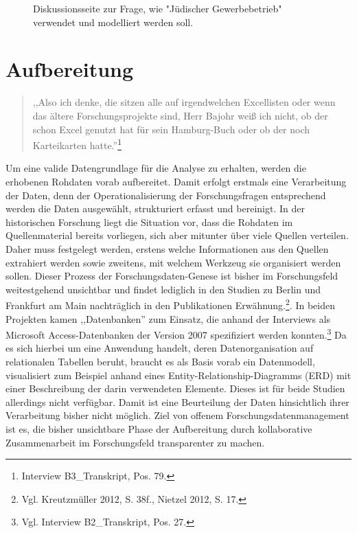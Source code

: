 \begin{figure}[h]
    \centering
    \caption[Diskussionsseite zu Jüdischer Gewerbebetrieb in Wikidata]{Diskussionsseite zur Frage, wie "Jüdischer Gewerbebetrieb" verwendet und modelliert werden soll.}
    \label{fig:x cubed graph}
\end{figure}

\section{Aufbereitung}

\begin{quote}
    ,,Also ich denke, die sitzen alle auf irgendwelchen Excellisten oder wenn das ältere Forschungsprojekte sind, Herr Bajohr weiß ich nicht, ob der schon Excel genutzt hat für sein Hamburg-Buch oder ob der noch Karteikarten hatte.''\footnote{Interview B3\_Transkript, Pos. 79.}
\end{quote}

Um eine valide Datengrundlage für die Analyse zu erhalten, werden die erhobenen Rohdaten vorab aufbereitet. Damit erfolgt erstmals eine Verarbeitung der Daten, denn der Operationalisierung der Forschungsfragen entsprechend werden die Daten ausgewählt, strukturiert erfasst und bereinigt. In der historischen Forschung liegt die Situation vor, dass die Rohdaten im Quellenmaterial bereits vorliegen, sich aber mitunter über viele Quellen verteilen. Daher muss festgelegt werden, erstens welche Informationen aus den Quellen extrahiert werden sowie zweitens, mit welchem Werkzeug sie organisiert werden sollen. Dieser Prozess der Forschungsdaten-Genese ist bisher im Forschungsfeld weitestgehend unsichtbar und findet lediglich in den Studien zu Berlin und Frankfurt am Main nachträglich in den Publikationen Erwähnung.\footnote{Vgl. Kreutzmüller 2012, S. 38f., Nietzel 2012, S. 17.}. In beiden Projekten kamen ,,Datenbanken'' zum Einsatz, die anhand der Interviews als Microsoft Access-Datenbanken der Version 2007 spezifiziert werden konnten.\footnote{Vgl. Interview B2\_Transkript, Pos. 27.} Da es sich hierbei um eine Anwendung handelt, deren Datenorganisation auf relationalen Tabellen beruht, braucht es als Basis vorab ein Datenmodell, visualisiert zum Beispiel anhand eines Entity-Relationship-Diagramms (ERD) mit einer Beschreibung der darin verwendeten Elemente. Dieses ist für beide Studien allerdings nicht verfügbar. Damit ist eine Beurteilung der Daten hinsichtlich ihrer Verarbeitung bisher nicht möglich. Ziel von offenem Forschungsdatenmanagement ist es, die bisher unsichtbare Phase der Aufbereitung durch kollaborative Zusammenarbeit im Forschungsfeld transparenter zu machen. 

